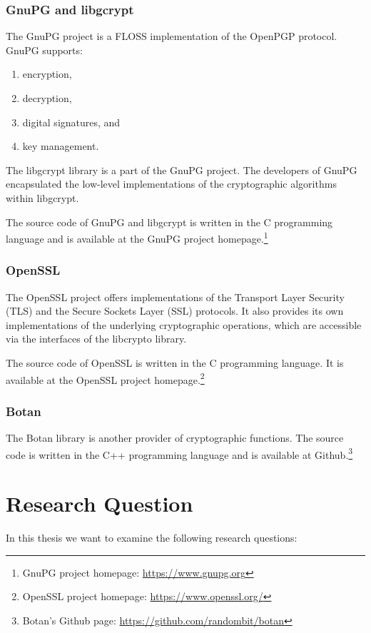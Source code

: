   \subsubsection{GnuPG and libgcrypt}

The GnuPG project is a FLOSS implementation of the OpenPGP protocol.
GnuPG supports:
\begin{enumerate}
\item encryption,
\item decryption,
\item digital signatures, and
\item key management.\cite{gnupg-doc}
\end{enumerate}

The libgcrypt library is a part of the GnuPG project.
The developers of GnuPG encapsulated the low-level implementations of the cryptographic algorithms within libgcrypt.

The source code of GnuPG and libgcrypt is written in the C programming language and is available at the GnuPG project homepage.\footnote{GnuPG project homepage: \url{https://www.gnupg.org}}

  \subsubsection{OpenSSL}

The OpenSSL project offers implementations of the Transport Layer Security (TLS) and the Secure Sockets Layer (SSL) protocols.
It also provides its own implementations of the underlying cryptographic operations, which are accessible via the interfaces of the libcrypto library.

The source code of OpenSSL is written in the C programming language.
It is available at the OpenSSL project homepage.\footnote{OpenSSL project homepage: \url{https://www.openssl.org/}}

  \subsubsection{Botan}

The Botan library is another provider of cryptographic functions.
The source code is written in the C++ programming language and is available at Github.\footnote{Botan's Github page: \url{https://github.com/randombit/botan}}

\section{Research Question}
\label{researchq}

In this thesis we want to examine the following research questions:



